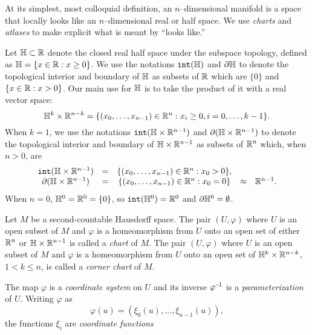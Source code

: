At its simplest, most colloquial definition, an $n$--dimensional manifold is a space that locally looks like an $n$--dimensional real or half space.
We use \emph{charts} and \emph{atlases} to make explicit what is meant by ``looks like.''


\begin{defn}[Coordinates]
	\label{def:coordinates}
	Let $\mathbb{H}\subset\mathbb{R}$ denote the closed real half space under the subspace topology, defined as $\mathbb{H}=\{x\in\mathbb{R} : x\geq 0\}$.
	We use the notations $\mathtt{int}(\mathbb{H})$ and $\partial \mathbb{H}$ to denote the topological interior and boundary of $\mathbb{H}$ as subsets of $\mathbb{R}$ which are $\{0\}$ and $\{x\in\mathbb{R}:x>0\}$.
	Our main use for $\mathbb{H}$ is to take the product of it with a real vector space:
	\[
		\mathbb{H}^k\times\mathbb{R}^{n-k}=\{(x_0,\dots,x_{n-1})\in\mathbb{R}^n : x_i\geq 0, i=0,\dots,k-1\}.
	\]
	When $k=1$, we use the notations $\mathtt{int}(\mathbb{H}\times\mathbb{R}^{n-1})$ and $\partial (\mathbb{H}\times\mathbb{R}^{n-1})$ to denote the topological interior and boundary of $\mathbb{H}\times\mathbb{R}^{n-1}$ as subsets of $\mathbb{R}^n$ which, when $n>0$, are
	\[
		\begin{array}{ccccc}
			\mathtt{int}(\mathbb{H}\times\mathbb{R}^{n-1}) & = & \{(x_0,\dots,x_{n-1})\in\mathbb{R}^n : x_0 > 0\}, & &\\
			\partial (\mathbb{H}\times\mathbb{R}^{n-1})	& = & \{(x_0,\dots,x_{n-1})\in\mathbb{R}^n : x_0 = 0\} & \approx & \mathbb{R}^{n-1}.
		\end{array}
	\]
	When $n=0$, $\mathbb{H}^0 = \mathbb{R}^0 = \{0\}$, so $\mathtt{int}(\mathbb{H}^0)=\mathbb{R}^0$ and $\partial\mathbb{H}^0=\emptyset$.

	Let $M$ be a second-countable Hausdorff space.
	The pair $(U,\varphi)$ where $U$ is an open subset of $M$ and $\varphi$ is a homeomorphism from $U$ onto an open set of either $\mathbb{R}^n$ or $\mathbb{H}\times\mathbb{R}^{n-1}$ is called a \emph{chart} of $M$.
	The pair $(U,\varphi)$ where $U$ is an open subset of $M$ and $\varphi$ is a homeomorphism from $U$ onto an open set of $\mathbb{H}^k\times\mathbb{R}^{n-k}$, $1<k\leq n$, is called a \emph{corner chart} of $M$.
	
	The map $\varphi$ is a \emph{coordinate system} on $U$ and its inverse $\varphi^{\,\text{-}1}$ is a \emph{parameterization} of $U$.
	Writing $\varphi$ as
	\[
		\varphi(u) = (\xi_0(u),\dots,\xi_{n-1}(u)),
	\]
	the functions $\xi_i$ are \emph{coordinate functions}
\end{defn}

